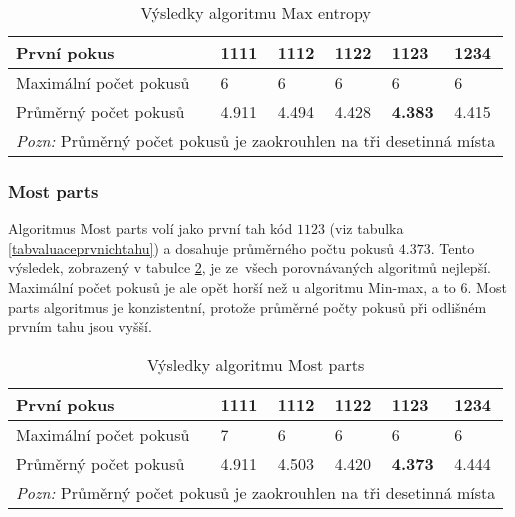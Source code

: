 \begin{table}[h]
\centering
\begin{tabular}{l l l l l l}
\toprule
První pokus & 1111 & 1112 & 1122 & 1123 & \textbf{1234} \\
\midrule

Maximální počet pokusů 
& 6 & 6 & 6 & 6 & 6 \\

Průměrný počet pokusů 
& 4.911 & 4.494 & 4.428 & \textbf{4.383} & 4.415 \\
\bottomrule
\multicolumn{6}{l}{\footnotesize \textit{Pozn:}
Průměrný počet pokusů je zaokrouhlen na tři desetinná místa}
\end{tabular}
\caption{Výsledky algoritmu Max entropy}\label{tabentropievysl}
\end{table}



\subsubsection{Most parts}
Algoritmus Most parts volí jako první tah kód $1123$ (viz tabulka \ref{tabvaluaceprvnichtahu}) a dosahuje průměrného počtu pokusů $4.373$. Tento výsledek, zobrazený v tabulce \ref{tabcastivysl}, je ze~všech porovnávaných algoritmů nejlepší. Maximální počet pokusů je ale opět horší než u algoritmu Min-max, a to 6. Most parts algoritmus je konzistentní, protože průměrné počty pokusů při odlišném prvním tahu jsou vyšší.


\begin{table}[h]
\centering
\begin{tabular}{l l l l l l}
\toprule
První pokus & 1111 & 1112 & 1122 & \textbf{1123} & 1234 \\
\midrule

Maximální počet pokusů 
& 7 & 6 & 6 & 6 & 6 \\

Průměrný počet pokusů 
& 4.911 & 4.503 & 4.420 & \textbf{4.373} & 4.444\\
\bottomrule
\multicolumn{6}{l}{\footnotesize \textit{Pozn:}
Průměrný počet pokusů je zaokrouhlen na tři desetinná místa}
\end{tabular}
\caption{Výsledky algoritmu Most parts}\label{tabcastivysl}
\end{table}


